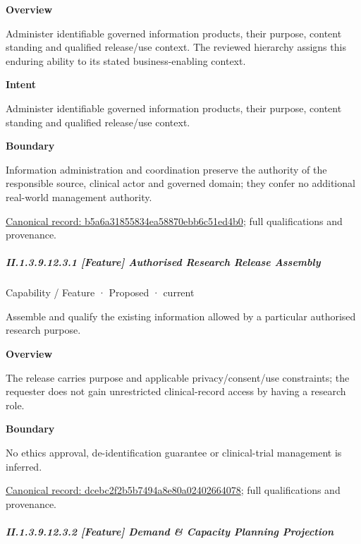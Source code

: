\textbf{Overview}



Administer identifiable governed information products, their purpose, content standing and qualified release/use context. The reviewed hierarchy assigns this enduring ability to its stated business-enabling context.



\textbf{Intent}



Administer identifiable governed information products, their purpose, content standing and qualified release/use context.



\textbf{Boundary}



Information administration and coordination preserve the authority of the responsible source, clinical actor and governed domain; they confer no additional real-world management authority.


{\footnotesize \href{../../../../../../../continuum/strategy/capability/b5a6a31855834ea58870ebb6c51ed4b0.md}{Canonical record: b5a6a31855834ea58870ebb6c51ed4b0}; full qualifications and provenance.}\par
\subparagraph*{II.1.3.9.12.3.1 [Feature] Authorised Research Release Assembly}
\label{navigation:II.1.3.9.12.3.1}

\label{element:dcebc2f2b5b7494a8e80a02402664078}
{\small Capability / Feature · Proposed · current}\par

Assemble and qualify the existing information allowed by a particular authorised research purpose.



\textbf{Overview}



The release carries purpose and applicable privacy/consent/use constraints; the requester does not gain unrestricted clinical-record access by having a research role.



\textbf{Boundary}



No ethics approval, de-identification guarantee or clinical-trial management is inferred.


{\footnotesize \href{../../../../../../../continuum/strategy/capability/feature/dcebc2f2b5b7494a8e80a02402664078.md}{Canonical record: dcebc2f2b5b7494a8e80a02402664078}; full qualifications and provenance.}\par
\subparagraph*{II.1.3.9.12.3.2 [Feature] Demand \& Capacity Planning Projection}
\label{navigation:II.1.3.9.12.3.2}

